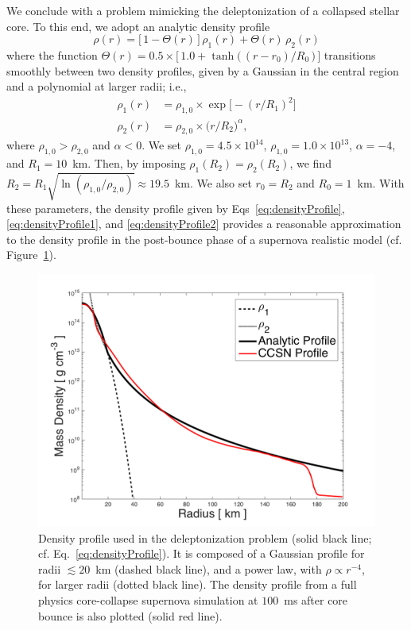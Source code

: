 \documentclass[10pt,preprint]{aastex}
\begin{document}
We conclude with a problem mimicking the deleptonization of a collapsed stellar core.  
To this end, we adopt an analytic density profile
\begin{equation}
  \rho(r)=\big[\,1-\Theta(r)\,\big]\,\rho_{1}(r)+\Theta(r)\,\rho_{2}(r)
  \label{eq:densityProfile}
\end{equation}
where the function $\Theta(r)=0.5\times\big[\,1.0+\tanh\big(\,(r-r_{0})/R_{0}\,\big)\,\big]$ transitions smoothly between two density profiles, given by a Gaussian in the central region and a polynomial at larger radii; i.e.,
\begin{align}
  \rho_{1}(r)
  &=\rho_{1,0}\times\exp\big[-(r/R_{1})^{2}\big]
  \label{eq:densityProfile1} \\
  \rho_{2}(r)
  &=\rho_{2,0}\times\big(r/R_{2}\big)^{\alpha},
  \label{eq:densityProfile2}
\end{align}
where $\rho_{1,0}>\rho_{2,0}$ and $\alpha<0$.  
We set $\rho_{1,0}=4.5\times10^{14}$, $\rho_{1,0}=1.0\times10^{13}$, $\alpha=-4$, and $R_{1}=10$~km.  
Then, by imposing $\rho_{1}(R_{2})=\rho_{2}(R_{2})$, we find $R_{2}=R_{1}\sqrt{\ln(\rho_{1,0}/\rho_{2,0})}\approx19.5$~km.  
We also set $r_{0}=R_{2}$ and $R_{0}=1$~km.  
With these parameters, the density profile given by Eqs~\eqref{eq:densityProfile}, \eqref{eq:densityProfile1}, and \eqref{eq:densityProfile2} provides a reasonable approximation to the density profile in the post-bounce phase of a supernova realistic model (cf. Figure~\ref{fig:analyticDensityProfile}).  

\begin{figure}
  \begin{center}
      \includegraphics[scale=0.5]{./Figures/AnalyticDensityProfile}
  \end{center}
  \caption{Density profile used in the deleptonization problem (solid black line; cf. Eq.~\eqref{eq:densityProfile}).  
  It is composed of a Gaussian profile for radii $\lesssim20$~km (dashed black line), and a power law, with $\rho\propto r^{-4}$, for larger radii (dotted black line).  
  The density profile from a full physics core-collapse supernova simulation at $100$~ms after core bounce is also plotted (solid red line).  }
  \label{fig:analyticDensityProfile}
\end{figure}
\end{document}
